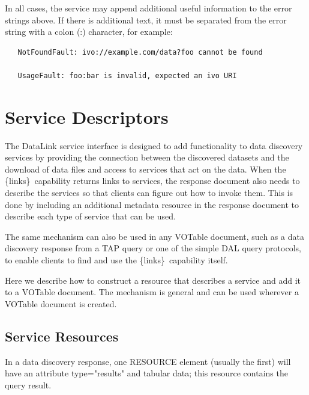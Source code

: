 \documentclass[11pt,a4paper]{ivoa}
\newcommand{\blinks}{\{links\}}
\newcommand{\attval}[2]{#1={\allowbreak}{"}#2{"}}
\begin{document}
In all cases, the service may append additional useful information to the
error strings above.
If there is additional text, it must be separated
from the error string with a colon (:) character, for example:
\begin{verbatim}
   NotFoundFault: ivo://example.com/data?foo cannot be found

   UsageFault: foo:bar is invalid, expected an ivo URI 
\end{verbatim}


\section{Service Descriptors}

The DataLink service interface is designed to add functionality to data
discovery services by providing the connection between the discovered
datasets and the download of data files and access to services that act
on the data. When the \blinks\ capability returns links to services, the
response document also needs to describe the services so that clients can
figure out how to invoke them. This is done by including an additional
metadata resource in the response document to describe each type of
service that can be used.

The same mechanism can also be used in any VOTable document, such
as a data discovery response from a TAP query or one of the simple
DAL query protocols, to enable clients to find and use the \blinks\
capability itself.

Here we describe how to construct a resource that describes a service
and add it to a VOTable document. The mechanism is general and can be
used wherever a VOTable document is created.


\subsection{Service Resources}

In a data discovery response, one RESOURCE element (usually the first)
will have an attribute \attval{type}{results} and tabular data; this resource
contains the query result.
\end{document}
